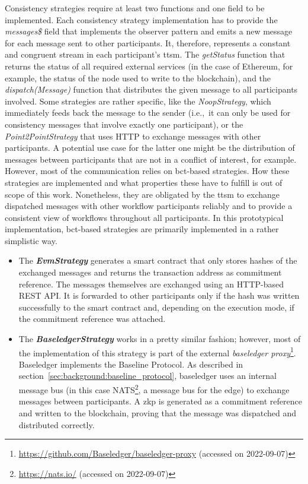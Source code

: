 Consistency strategies require at least two functions and one field to be implemented. Each consistency strategy implementation has to provide the \textit{messages\$} field that implements the observer pattern and emits a new message for each message sent to other participants. It, therefore, represents a constant and congruent stream in each participant's \gls{ttsm}. The \textit{getStatus} function that returns the status of all required external services (in the case of Ethereum, for example, the status of the node used to write to the blockchain), and the \textit{dispatch(Message)} function that distributes the given message to all participants involved. Some strategies are rather specific, like the \textit{NoopStrategy}, which immediately feeds back the message to the sender (i.e.,\ it can only be used for consistency messages that involve exactly one participant), or the \textit{Point2PointStrategy} that uses HTTP to exchange messages with other participants. A potential use case for the latter one might be the distribution of messages between participants that are not in a conflict of interest, for example. However, most of the communication relies on \gls{bct}-based strategies. How these strategies are implemented and what properties these have to fulfill is out of scope of this work. Nonetheless, they are obligated by the \gls{ttsm} to exchange dispatched messages with other workflow participants reliably and to provide a consistent view of workflows throughout all participants. In this prototypical implementation, \gls{bct}-based strategies are primarily implemented in a rather simplistic way. %

\begin{itemize}
    \item The \textbf{\textit{EvmStrategy}} generates a smart contract that only stores hashes of the exchanged messages and returns the transaction address as commitment reference. The messages themselves are exchanged using an HTTP-based REST API\@. It is forwarded to other participants only if the hash was written successfully to the smart contract and, depending on the execution mode, if the commitment reference was attached.
    \item The \textbf{\textit{BaseledgerStrategy}} works in a pretty similar fashion; however, most of the implementation of this strategy is part of the external \textit{baseledger proxy}\footnote{\url{https://github.com/Baseledger/baseledger-proxy} (accessed on 2022-09-07)}. Baseledger implements the Baseline Protocol. As described in section~\ref{sec:background:baseline_protocol}, baseledger uses an internal message bus (in this case NATS\footnote{\url{https://nats.io/} (accessed on 2022-09-07)}, a message bus for the edge) to exchange messages between participants. A \gls{zkp} is generated as a commitment reference and written to the blockchain, proving that the message was dispatched and distributed correctly.
\end{itemize}

